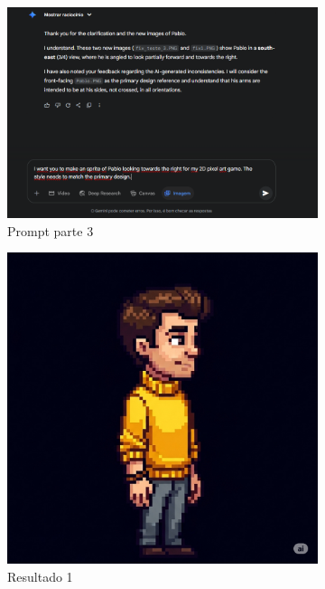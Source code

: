 \begin{figure}[htbp]
\begin{subfigure}{0.8\linewidth}
        \includegraphics[width=1\linewidth]{figs/geminiPro/chat4/tela3.PNG}
        \caption{\small Prompt parte 3}
        \label{fig:geminiPro10Prompt3}
    \end{subfigure}
    \begin{subfigure}{0.3\linewidth}
        \includegraphics[width=1\linewidth]{figs/geminiPro/chat4/res1_tela4.PNG}
        \caption{\small Resultado 1}
        \label{fig:geminiPro10a}
    \end{subfigure}
    \begin{subfigure}{0.3\linewidth}

\end{subfigure}
\end{figure}
